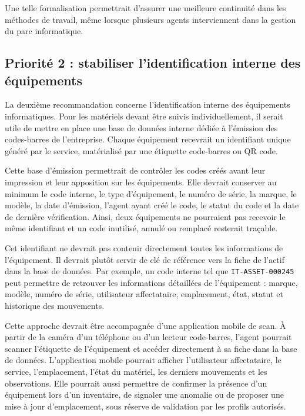 \documentclass[12pt,a4paper]{report}
\begin{document}
Une telle formalisation permettrait d'assurer une meilleure continuité dans les méthodes de travail, même lorsque plusieurs agents interviennent dans la gestion du parc informatique.

\subsection{Priorité 2 : stabiliser l'identification interne des équipements}

La deuxième recommandation concerne l'identification interne des équipements informatiques. Pour les matériels devant être suivis individuellement, il serait utile de mettre en place une base de données interne dédiée à l'émission des codes-barres de l'entreprise. Chaque équipement recevrait un identifiant unique généré par le service, matérialisé par une étiquette code-barres ou QR code.

Cette base d'émission permettrait de contrôler les codes créés avant leur impression et leur apposition sur les équipements. Elle devrait conserver au minimum le code interne, le type d'équipement, le numéro de série, la marque, le modèle, la date d'émission, l'agent ayant créé le code, le statut du code et la date de dernière vérification. Ainsi, deux équipements ne pourraient pas recevoir le même identifiant et un code inutilisé, annulé ou remplacé resterait traçable.

Cet identifiant ne devrait pas contenir directement toutes les informations de l'équipement. Il devrait plutôt servir de clé de référence vers la fiche de l'actif dans la base de données. Par exemple, un code interne tel que \texttt{IT-ASSET-000245} peut permettre de retrouver les informations détaillées de l'équipement : marque, modèle, numéro de série, utilisateur affectataire, emplacement, état, statut et historique des mouvements.

Cette approche devrait être accompagnée d'une application mobile de scan. À partir de la caméra d'un téléphone ou d'un lecteur code-barres, l'agent pourrait scanner l'étiquette de l'équipement et accéder directement à sa fiche dans la base de données. L'application mobile pourrait afficher l'utilisateur affectataire, le service, l'emplacement, l'état du matériel, les derniers mouvements et les observations. Elle pourrait aussi permettre de confirmer la présence d'un équipement lors d'un inventaire, de signaler une anomalie ou de proposer une mise à jour d'emplacement, sous réserve de validation par les profils autorisés.
\end{document}
